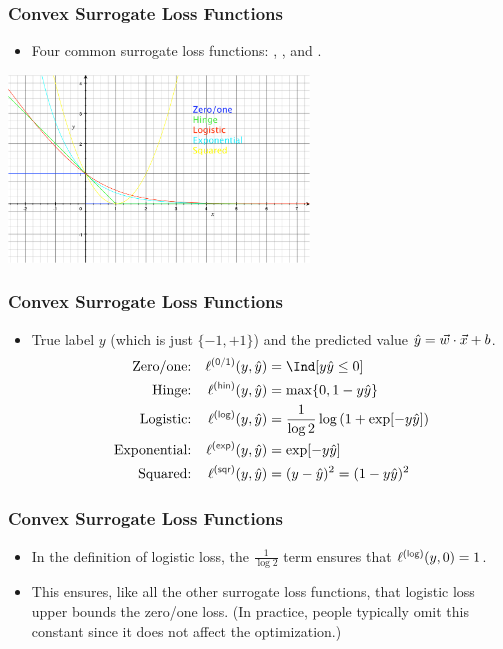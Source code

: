 \documentclass[trans,aspectratio=169]{beamer}
\begin{document}
\begin{frame}
  \frametitle{Convex Surrogate Loss Functions}
\begin{itemize}
\item
Four common surrogate loss functions: , ,
 and . 
\end{itemize}
\begin{center}
 \includegraphics[width=0.6\textwidth]{loss}
\end{center}
\end{frame}

\begin{frame}
  \frametitle{Convex Surrogate Loss Functions}
\begin{itemize}
\item True label $y$ (which is just $\{-1,+1\}$) and
the predicted value $\hat y = {\vec w} \cdot {\vec x}+b$.
%
\begin{align}
\text{Zero/one:}    && \ell\xth{0/1}(y,\hat y) &= \Ind[y \hat y \leq 0] \\
\text{Hinge:}       && \ell\xth{hin}(y,\hat y) &= \max \{ 0, 1-y\hat y \}\\
\text{Logistic:}    && \ell\xth{log}(y,\hat y) &= \frac 1 {\log2} \log\left( 1 + \exp[-y\hat y]\right)\\
\text{Exponential:} && \ell\xth{exp}(y,\hat y) &= \exp[-y\hat y]\\
\text{Squared:}     && \ell\xth{sqr}(y,\hat y) &= (y-\hat y)^2=(1-y\hat y)^2
\end{align}
%
\end{itemize}
\end{frame}

\begin{frame}
  \frametitle{Convex Surrogate Loss Functions}
\begin{itemize}
\item
In the definition of logistic loss, the $\frac 1 {\log2}$ term ensures that $\ell\xth{log}(y,0) = 1$. 
\item  This
ensures, like all the other surrogate loss functions, that logistic
loss upper bounds the zero/one loss.  (In practice, people typically
omit this constant since it does not affect the optimization.)
\end{itemize}
\end{frame}
\end{document}
